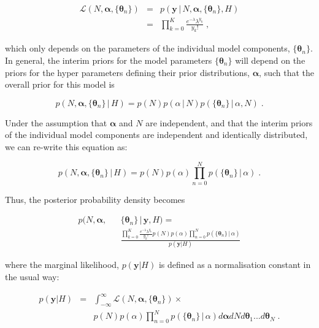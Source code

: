 \documentclass[12pt]{emulateapj}
\newcommand{\given}{\,|\,}
\newcommand{\counts}{y}
\newcommand{\likelihood}{{\mathcal L}}
\begin{document}
\begin{eqnarray}
\likelihood(N, \bm{\alpha}, \{\bm{\theta}_n \}) & = & p(\bm{\counts} \given N, \bm{\alpha}, \{\bm{\theta}_n \}, H) \\ \nonumber
 &= & \prod\limits_{k=0}^{K}{ \frac{e^{-\lambda} \lambda^{y_k} }{y_k! }} \; ,
\end{eqnarray}

which only depends on the parameters of the individual model components, $\{\bm{\theta}_n\}$. In general, the interim priors for the model 
parameters $\{\bm{\theta}_n\}$ will depend on the priors for the hyper parameters defining their prior distributions, $\bm{\alpha}$, such that the
overall prior for this model is

\begin{equation}
p(N, \bm{\alpha}, \{\bm{\theta}_n \} \given H) = p(N)p(\alpha\given N)p(\{\bm{\theta}_n\}\given \alpha, N) \; .
\end{equation}

Under the assumption that $\bm{\alpha}$ and $N$ are independent, and that the interim priors of the individual model components are
independent and identically distributed, we can re-write this equation as:

\begin{equation}
p(N, \bm{\alpha}, \{\bm{\theta}_n \} \given H) = p(N)p(\alpha) \prod\limits_{n=0}^{N}  p(\{\bm{\theta}_n\}\given \alpha) \; .
\end{equation}

Thus, the posterior probability density becomes

\begin{eqnarray}
p(N, \bm{\alpha}, &&\{\bm{\theta}_n \}  \given \bm{\counts}, H) = \\ 
&& \frac{\prod\limits_{k=0}^{K}{ \frac{e^{-\lambda} \lambda^{y_k} }{y_k! }} p(N)p(\alpha) \prod\limits_{n=0}^{N}  p(\{\bm{\theta}_n\}\given \alpha)}{p(\bm{\counts} | H)}  \nonumber
\end{eqnarray}

where the marginal likelihood, $p(\bm{\counts} | H)$ is defined as a normalisation constant in the usual way: 

\begin{eqnarray}
p(\bm{\counts} | H) & = & \int_{-\infty}^{\infty}{\likelihood(N, \bm{\alpha}, \{\bm{\theta}_n \})} \times \\ \nonumber
&& p(N)p(\alpha) \prod\limits_{n=0}^{N}  p(\{\bm{\theta}_n\}\given \alpha) d\bm{\alpha} dN d\bm{\theta}_1 ... d\bm{\theta}_N \; .
\end{eqnarray}
\end{document}
